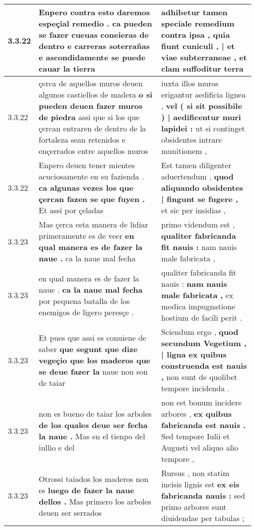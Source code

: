 \begin{tabular}{|p{1cm}|p{6.5cm}|p{6.5cm}|}
3.3.22 & Enpero contra esto daremos espeçial remedio . \textbf{ ca pueden se fazer cueuas coneieras de dentro e carreras soterrañas } e ascondidamente se puede cauar la tierra & adhibetur tamen speciale remedium contra ipsa , \textbf{ quia fiunt cuniculi , | et viae subterraneae , } et clam suffoditur terra \\\hline
3.3.22 & çerca de aquellos muros deuen algunos castiellos de madera \textbf{ o si pueden deuen fazer muros de piedra } assi que si los que çercan entraren de dentro de la fortaleza sean retenidos e ençerrados entre aquellos muros & iuxta illos muros erigantur aedificia lignea , \textbf{ vel ( si sit possibile ) | aedificentur muri lapidei : } ut si continget obsidentes intrare munitionem , \\\hline
3.3.22 & Enpero deuen tener mientes acuciosamente en su fazienda . \textbf{ ca algunas vezes los que çercan fazen se que fuyen . } Et assi por çeladas & Est tamen diligenter aduertendum , \textbf{ quod aliquando obsidentes | fingunt se fugere , } et sic per insidias , \\\hline
3.3.23 & Mas çerca esta manera de lidiar primeramente es de veer \textbf{ en qual manera es de fazer la naue . } ca la naue mal fecha & primo videndum est , \textbf{ qualiter fabricanda fit nauis : } nam nauis male fabricata , \\\hline
3.3.23 & en qual manera es de fazer la naue . \textbf{ ca la naue mal fecha } por pequena batalla de los enemigos de ligero peresçe . & qualiter fabricanda fit nauis : \textbf{ nam nauis male fabricata , } ex modica impugnatione hostium de facili perit . \\\hline
3.3.23 & Et pues que assi es conuiene de saber \textbf{ que segunt que dize vegeçio que los maderos que se deue fazer la } naue non son de taiar & Sciendum ergo , \textbf{ quod secundum Vegetium , | ligna ex quibus construenda est nauis , } non sunt de quolibet tempore incidenda . \\\hline
3.3.23 & non es bueno de taiar los arboles \textbf{ de los quales deue ser fecha la naue . } Mas en el tienpo del iullio e del & non est bonum incidere arbores , \textbf{ ex quibus fabricanda est nauis . } Sed tempore Iulii et Augusti vel aliquo alio tempore , \\\hline
3.3.23 & Otrossi taiados los maderos non es \textbf{ luego de fazer la naue dellos . } Mas primero los arboles deuen ser serrados & Rursus , non statim incisis lignis est \textbf{ ex eis fabricanda nauis : } sed primo arbores sunt diuidendae per tabulas ; \\\hline

\end{tabular}
